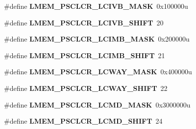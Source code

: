 \begin{DoxyCompactItemize}
\item 
\hypertarget{group___l_m_e_m___register___masks_ga6bcf803a6a8c5c9f2f855a8319df740e}{}\#define {\bfseries L\+M\+E\+M\+\_\+\+P\+S\+C\+L\+C\+R\+\_\+\+L\+C\+I\+V\+B\+\_\+\+M\+A\+S\+K}~0x100000u\label{group___l_m_e_m___register___masks_ga6bcf803a6a8c5c9f2f855a8319df740e}

\item 
\hypertarget{group___l_m_e_m___register___masks_ga0bd22e7dcbe7da553092072ada0cf79e}{}\#define {\bfseries L\+M\+E\+M\+\_\+\+P\+S\+C\+L\+C\+R\+\_\+\+L\+C\+I\+V\+B\+\_\+\+S\+H\+I\+F\+T}~20\label{group___l_m_e_m___register___masks_ga0bd22e7dcbe7da553092072ada0cf79e}

\item 
\hypertarget{group___l_m_e_m___register___masks_gaee911cb3d433b0d680e6e79ae8732a30}{}\#define {\bfseries L\+M\+E\+M\+\_\+\+P\+S\+C\+L\+C\+R\+\_\+\+L\+C\+I\+M\+B\+\_\+\+M\+A\+S\+K}~0x200000u\label{group___l_m_e_m___register___masks_gaee911cb3d433b0d680e6e79ae8732a30}

\item 
\hypertarget{group___l_m_e_m___register___masks_ga1eb52f9e1b3fd0cbc9238866d515da97}{}\#define {\bfseries L\+M\+E\+M\+\_\+\+P\+S\+C\+L\+C\+R\+\_\+\+L\+C\+I\+M\+B\+\_\+\+S\+H\+I\+F\+T}~21\label{group___l_m_e_m___register___masks_ga1eb52f9e1b3fd0cbc9238866d515da97}

\item 
\hypertarget{group___l_m_e_m___register___masks_gaf528e4a501941c86f0e3374ad0f9a419}{}\#define {\bfseries L\+M\+E\+M\+\_\+\+P\+S\+C\+L\+C\+R\+\_\+\+L\+C\+W\+A\+Y\+\_\+\+M\+A\+S\+K}~0x400000u\label{group___l_m_e_m___register___masks_gaf528e4a501941c86f0e3374ad0f9a419}

\item 
\hypertarget{group___l_m_e_m___register___masks_gab321472510216debd0506f643c83d5c4}{}\#define {\bfseries L\+M\+E\+M\+\_\+\+P\+S\+C\+L\+C\+R\+\_\+\+L\+C\+W\+A\+Y\+\_\+\+S\+H\+I\+F\+T}~22\label{group___l_m_e_m___register___masks_gab321472510216debd0506f643c83d5c4}

\item 
\hypertarget{group___l_m_e_m___register___masks_gaf8490c077f19deb449f09ed95d039a54}{}\#define {\bfseries L\+M\+E\+M\+\_\+\+P\+S\+C\+L\+C\+R\+\_\+\+L\+C\+M\+D\+\_\+\+M\+A\+S\+K}~0x3000000u\label{group___l_m_e_m___register___masks_gaf8490c077f19deb449f09ed95d039a54}

\item 
\hypertarget{group___l_m_e_m___register___masks_gaf99620458b21c52afe1fe29ca10f1137}{}\#define {\bfseries L\+M\+E\+M\+\_\+\+P\+S\+C\+L\+C\+R\+\_\+\+L\+C\+M\+D\+\_\+\+S\+H\+I\+F\+T}~24\label{group___l_m_e_m___register___masks_gaf99620458b21c52afe1fe29ca10f1137}


\end{DoxyCompactItemize}
